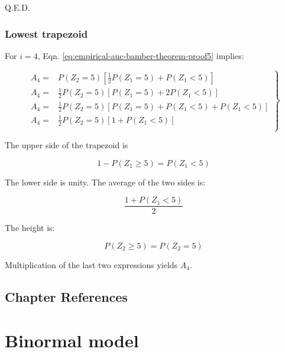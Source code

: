 \documentclass[
]{book}
\begin{document}
Q.E.D.

\hypertarget{lowest-trapezoid}{%
\subsection{Lowest trapezoid}\label{lowest-trapezoid}}

For \(i = 4\), Eqn. \eqref{eq:empirical-auc-bamber-theorem-proof5} implies:

\begin{equation}
\left.
\begin{aligned}
A_4 =& P\left ( Z_2=5 \right )\left [ \frac{1}{2}P\left ( Z_1=5 \right ) + P\left ( Z_1<5 \right )\right ] \\
A_4 =& \frac{1}{2}P\left ( Z_2=5 \right )\left [ P\left ( Z_1=5 \right ) + 2P\left ( Z_1<5 \right )\right ] \\
A_4 =& \frac{1}{2}P\left ( Z_2=5 \right )\left [ P\left ( Z_1=5 \right ) +P\left ( Z_1<5 \right ) + P\left ( Z_1<5 \right )\right ] \\
A_4 =& \frac{1}{2}P\left ( Z_2=5 \right )\left [ 1 + P\left ( Z_1<5 \right )\right ] \\
\end{aligned}
\right \}
\end{equation}

The upper side of the trapezoid is

\begin{equation}
1-P\left ( Z_1 \geq 5 \right )= P\left ( Z_1 < 5 \right )
\end{equation}

The lower side is unity. The average of the two sides is:

\begin{equation}
\frac{1 + P\left ( Z_1 < 5 \right )}{2}
\end{equation}

The height is:

\begin{equation}
P\left ( Z_2 \geq 5 \right ) = P\left ( Z_2 = 5 \right )
\end{equation}

Multiplication of the last two expressions yields \(A_4\).

\hypertarget{empirical-auc-references}{%
\section{Chapter References}\label{empirical-auc-references}}

\hypertarget{binormal-model}{%
\chapter{Binormal model}\label{binormal-model}}
\end{document}
